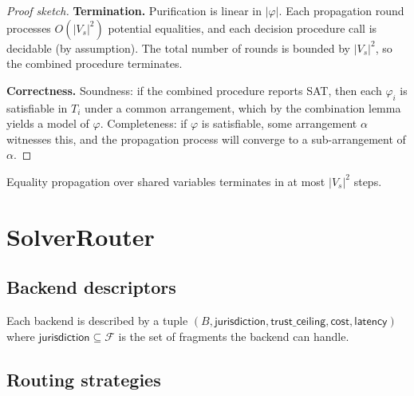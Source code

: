 \documentclass[11pt]{article}
\begin{document}
\begin{proof}[Proof sketch]
\medskip\noindent\textbf{Termination.}\quad
Purification is linear in $|\varphi|$.  Each propagation
round processes $O(|V_s|^2)$ potential equalities, and
each decision procedure call is decidable (by assumption).
The total number of rounds is bounded by $|V_s|^2$, so
the combined procedure terminates.

\medskip\noindent\textbf{Correctness.}\quad
Soundness: if the combined procedure reports SAT, then
each $\varphi_i$ is satisfiable in $T_i$ under a common
arrangement, which by the combination lemma yields a
model of $\varphi$.  Completeness: if $\varphi$ is
satisfiable, some arrangement $\alpha$ witnesses this,
and the propagation process will converge to a
sub-arrangement of $\alpha$.
\end{proof}

\begin{lemma}\label{lem:shared}
Equality propagation over shared variables terminates in
at most $|V_s|^2$ steps.
\end{lemma}


\section{SolverRouter}\label{sec:router}

\subsection{Backend descriptors}

Each backend is described by a tuple
$(B, \mathsf{jurisdiction}, \mathsf{trust\_ceiling},
\mathsf{cost}, \mathsf{latency})$
where $\mathsf{jurisdiction} \subseteq \mathcal{F}$ is the set
of fragments the backend can handle.

\subsection{Routing strategies}
\end{document}
